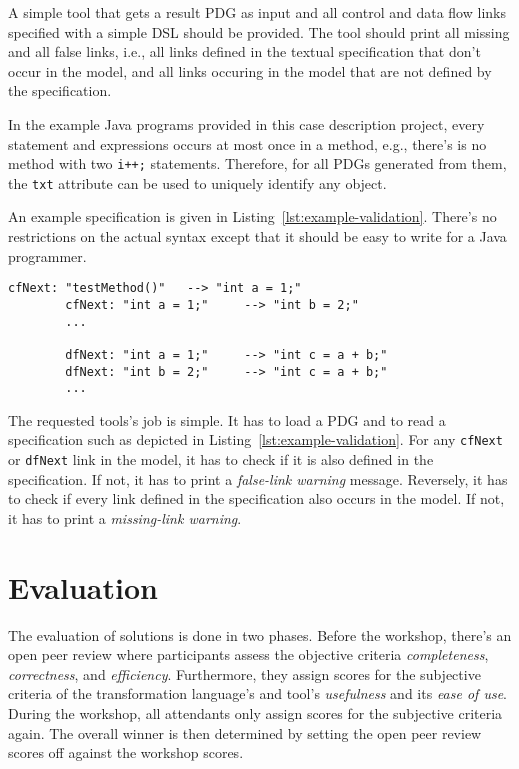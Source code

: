 \documentclass[submission]{eptcs}
\begin{document}
A simple tool that gets a result PDG as input and all control and data flow
links specified with a simple DSL should be provided.  The tool should print
all missing and all false links, i.e., all links defined in the textual
specification that don't occur in the model, and all links occuring in the
model that are not defined by the specification.

In the example Java programs provided in this case description project, every
statement and expressions occurs at most once in a method, e.g., there's is no
method with two \verb|i++;| statements.  Therefore, for all PDGs generated from
them, the \verb|txt| attribute can be used to uniquely identify any object.

An example specification is given in Listing~\ref{lst:example-validation}.
There's no restrictions on the actual syntax except that it should be easy to
write for a Java programmer.

\begin{lstlisting}[caption={An example validation DSL for result PDGs},label={lst:example-validation}]
        cfNext: "testMethod()"   --> "int a = 1;"
        cfNext: "int a = 1;"     --> "int b = 2;"
        ...

        dfNext: "int a = 1;"     --> "int c = a + b;"
        dfNext: "int b = 2;"     --> "int c = a + b;"
        ...
\end{lstlisting}

The requested tools's job is simple.  It has to load a PDG and to read a
specification such as depicted in Listing~\ref{lst:example-validation}.  For
any \verb|cfNext| or \verb|dfNext| link in the model, it has to check if it is
also defined in the specification.  If not, it has to print a \emph{false-link
  warning} message.  Reversely, it has to check if every link defined in the
specification also occurs in the model.  If not, it has to print a
\emph{missing-link warning}.


\section{Evaluation}
\label{sec:evaluation-criteria}

The evaluation of solutions is done in two phases.  Before the workshop,
there's an open peer review where participants assess the objective criteria
\emph{completeness}, \emph{correctness}, and \emph{efficiency}.  Furthermore,
they assign scores for the subjective criteria of the transformation language's
and tool's \emph{usefulness} and its \emph{ease of use}.  During the workshop,
all attendants only assign scores for the subjective criteria again.  The
overall winner is then determined by setting the open peer review scores off
against the workshop scores.



\end{document}

